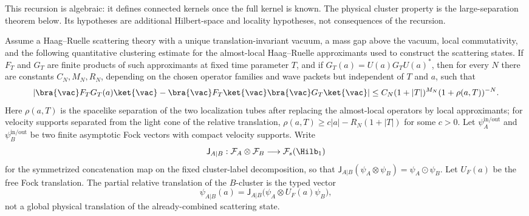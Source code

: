 This recursion is algebraic: it defines
connected kernels once the full kernel is known.  The physical cluster
property is the large-separation theorem below.  Its hypotheses are additional
Hilbert-space and locality hypotheses, not consequences of the recursion.

\begin{theorem}
\label{thm:scattering-cluster-decomposition}
Assume a Haag--Ruelle scattering theory with a unique translation-invariant
vacuum, a mass gap above the vacuum, local commutativity, and the following
quantitative clustering estimate for the almost-local Haag--Ruelle
approximants used to construct the scattering states.  If \(F_T\) and \(G_T\)
are finite products of such approximants at fixed time parameter \(T\), and
if \(G_T(a)=U(a)G_TU(a)^*\), then for every \(N\) there are constants
\(C_N,M_N,R_N\), depending on the chosen operator families and wave packets
but independent of \(T\) and \(a\), such that
\begin{equation}
  \left|
  \bra{\vac}F_TG_T(a)\ket{\vac}
  -
  \bra{\vac}F_T\ket{\vac}\bra{\vac}G_T\ket{\vac}
  \right|
  \le
  C_N(1+|T|)^{M_N}(1+\rho(a,T))^{-N}.
  \label{eq:hr-quantitative-cluster-estimate}
\end{equation}
Here \(\rho(a,T)\) is the spacelike separation of the two localization tubes
after replacing the almost-local operators by local approximants; for
velocity supports separated from the light cone of the relative translation,
\(\rho(a,T)\ge c|a|-R_N(1+|T|)\) for some \(c>0\).  Let
\(\psi_A^{\mathrm{in/out}}\) and \(\psi_B^{\mathrm{in/out}}\) be two finite
asymptotic Fock vectors with compact velocity supports.  Write
\[
  \mathsf J_{A|B}:
  \mathcal F_A\otimes\mathcal F_B\longrightarrow\mathcal F_s(\Hilb_1)
\]
for the symmetrized concatenation map on the fixed cluster-label
decomposition, so that
\(\mathsf J_{A|B}(\psi_A\otimes\psi_B)=\psi_A\odot\psi_B\).  Let \(U_F(a)\)
be the free Fock translation.  The partial relative translation of the
\(B\)-cluster is the typed vector
\begin{equation}
  \psi_{A|B}(a)
  =
  \mathsf J_{A|B}\bigl(\psi_A\otimes U_F(a)\psi_B\bigr),
  \label{eq:partial-fock-cluster-translation}
\end{equation}
not a global physical translation of the already-combined scattering state.


\end{theorem}
